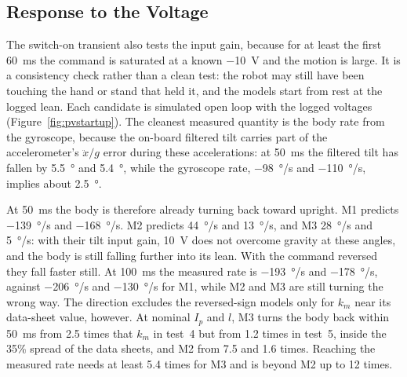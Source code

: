 \subsection{Response to the Voltage}
\label{sec:voltagetest}

The switch-on transient also tests the input gain, because for at least
the first \SI{60}{ms} the command is saturated at a known \SI{-10}{V} and the
motion is large. It is a consistency check rather than a clean test: the robot
may still have been touching the hand or stand that held it, and the models
start from rest at the logged lean. Each candidate is simulated open loop with
the logged voltages (Figure~\ref{fig:pvstartup}). The cleanest measured
quantity is the body rate from the gyroscope, because the on-board filtered
tilt carries part of the accelerometer's $\ddot x/g$ error during these
accelerations: at \SI{50}{ms} the filtered tilt has fallen by
\SI{5.5}{\degree} and \SI{5.4}{\degree}, while the gyroscope rate,
\SI{-98}{\degree/s} and \SI{-110}{\degree/s}, implies about \SI{2.5}{\degree}.

At \SI{50}{ms} the body is therefore already turning back toward upright. M1
predicts \SI{-139}{\degree/s} and \SI{-168}{\degree/s}. M2 predicts
\SI{+44}{\degree/s} and \SI{+13}{\degree/s}, and M3 \SI{+28}{\degree/s} and
\SI{+5}{\degree/s}: with their tilt input gain, \SI{10}{V} does not overcome
gravity at these angles, and the body is still falling further into its lean.
With the command reversed they fall faster still. At \SI{100}{ms} the measured
rate is \SI{-193}{\degree/s} and \SI{-178}{\degree/s}, against
\SI{-206}{\degree/s} and \SI{-130}{\degree/s} for M1, while M2 and M3 are still
turning the wrong way. The direction excludes the reversed-sign models only for
$k_m$ near its data-sheet value, however. At nominal $I_p$ and $l$, M3 turns
the body back within \SI{50}{ms} from 2.5 times that $k_m$ in test~4 but from
1.2 times in test~5, inside the 35\% spread of the data sheets, and M2 from 7.5
and 1.6 times. Reaching the measured rate needs at least 5.4 times for M3 and
is beyond M2 up to 12 times.

